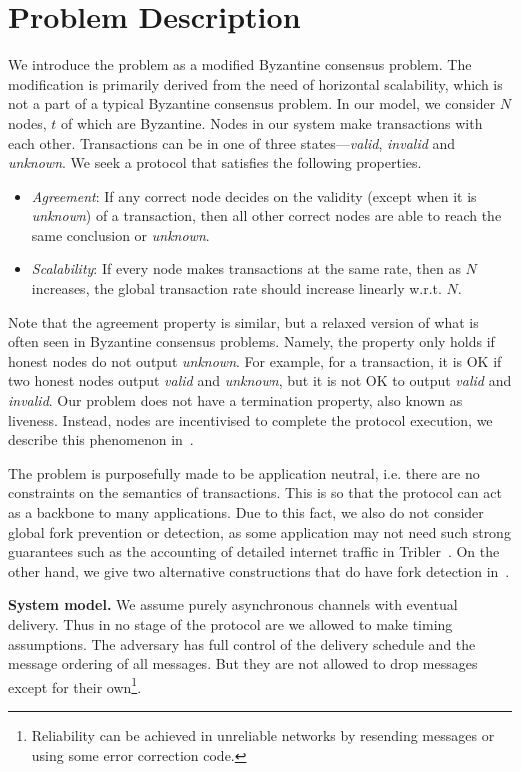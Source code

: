\section{Problem Description}
\label{sec:description}
We introduce the problem as a modified Byzantine consensus problem.
The modification is primarily derived from the need of horizontal scalability,
which is not a part of a typical Byzantine consensus problem.
In our model, we consider $N$ nodes, $t$ of which are Byzantine.
Nodes in our system make transactions with each other.
Transactions can be in one of three states---\emph{valid}, \emph{invalid} and \emph{unknown}.
We seek a protocol that satisfies the following properties.
\begin{itemize}
    \item \emph{Agreement}:
        If any correct node decides on the validity (except when it is \emph{unknown}) of a transaction,
        then all other correct nodes are able to reach the same conclusion or \emph{unknown}.
    \item \emph{Scalability}:
        If every node makes transactions at the same rate,
        then as $N$ increases,
        the global transaction rate should increase linearly w.r.t. $N$.
\end{itemize}

Note that the agreement property is similar, but a relaxed version of what is often seen in Byzantine consensus problems.
Namely, the property only holds if honest nodes do not output \emph{unknown}.
For example, for a transaction, it is OK if two honest nodes output \emph{valid} and \emph{unknown}, but it is not OK to output \emph{valid} and \emph{invalid}.
Our problem does not have a termination property, also known as liveness.
Instead, nodes are incentivised to complete the protocol execution, we describe this phenomenon in~.

The problem is purposefully made to be application neutral,
i.e. there are no constraints on the semantics of transactions.
This is so that the protocol can act as a backbone to many applications.
Due to this fact, we also do not consider global fork prevention or detection,
as some application may not need such strong guarantees such as the accounting of detailed internet traffic in Tribler~\cite{pimotte, pouwelse2008tribler}.
On the other hand, we give two alternative constructions that do have fork detection in~.

\textbf{System model.\quad}
We assume purely asynchronous channels with eventual delivery.
Thus in no stage of the protocol are we allowed to make timing assumptions.
The adversary has full control of the delivery schedule and the message ordering of all messages.
But they are not allowed to drop messages except for their own\footnote{Reliability can be achieved in unreliable networks by resending messages or using some error correction code.}.


